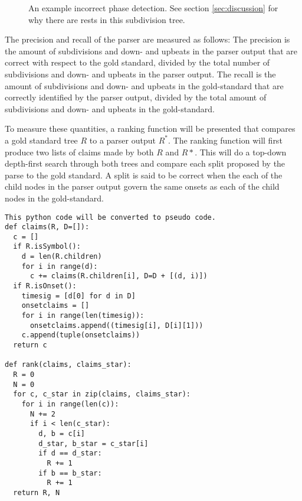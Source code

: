 \begin{figure}
\centering
{}
\caption{An example incorrect phase detection. See section \ref{sec:discussion} for why there are rests in this subdivision tree.}
\label{fig:phase_error}
\end{figure}


The precision and recall of the parser are measured as follows: The precision is the amount of subdivisions and down- and upbeats in the parser output that are correct with respect to the gold standard, divided by the total number of subdivisions and down- and upbeats in the parser output. The recall is the amount of subdivisions and down- and upbeats in the gold-standard that are correctly identified by the parser output, divided by the total amount of subdivisions and down- and upbeats in the gold-standard.

To measure these quantities, a ranking function will be presented that compares a gold standard tree $R$ to a parser output $R^*$. The ranking function will first produce two lists of claims made by  both $R$ and $R*$. 
 This  will do a top-down depth-first search through both trees and compare each split proposed by the parse to the gold standard. A split is said to be correct when the each of the child nodes in the parser output govern the same onsets as each of the child nodes in the gold-standard.

\begin{verbatim}
This python code will be converted to pseudo code.
def claims(R, D=[]):
  c = []
  if R.isSymbol():
    d = len(R.children)
    for i in range(d):
      c += claims(R.children[i], D=D + [(d, i)])
  if R.isOnset():
    timesig = [d[0] for d in D]
    onsetclaims = []
    for i in range(len(timesig)):
      onsetclaims.append((timesig[i], D[i][1]))
    c.append(tuple(onsetclaims))
  return c

def rank(claims, claims_star):
  R = 0
  N = 0
  for c, c_star in zip(claims, claims_star):
    for i in range(len(c)):
      N += 2
      if i < len(c_star):
        d, b = c[i]
        d_star, b_star = c_star[i]
        if d == d_star:
          R += 1
        if b == b_star:
          R += 1
  return R, N
\end{verbatim}

